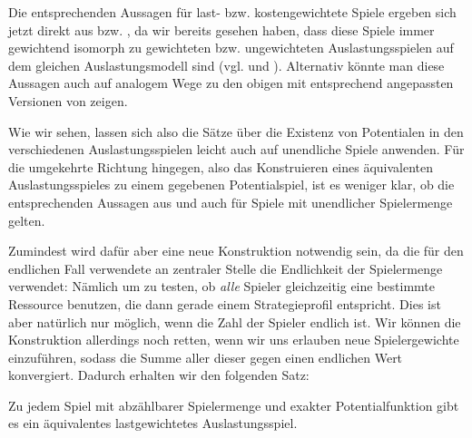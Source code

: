 \begin{bem}\label{bem:UnendlLastKostGewAusl}
	Die entsprechenden Aussagen für last- bzw. kostengewichtete Spiele ergeben sich jetzt direkt aus  bzw. , da wir bereits gesehen haben, dass diese Spiele immer gewichtend isomorph zu gewichteten bzw. ungewichteten Auslastungsspielen auf dem gleichen Auslastungsmodell sind (vgl.  und ). Alternativ könnte man diese Aussagen auch auf analogem Wege zu den obigen mit entsprechend angepassten Versionen von  zeigen.
\end{bem}

Wie wir sehen, lassen sich also die Sätze über die Existenz von Potentialen in den verschiedenen Auslastungsspielen leicht auch auf unendliche Spiele anwenden. Für die umgekehrte Richtung hingegen, also das Konstruieren eines äquivalenten Auslastungsspieles zu einem gegebenen Potentialspiel, ist es weniger klar, ob die entsprechenden Aussagen aus  und  auch für Spiele mit unendlicher Spielermenge gelten. 

Zumindest wird dafür aber eine neue Konstruktion notwendig sein, da die für den endlichen Fall verwendete an zentraler Stelle die Endlichkeit der Spielermenge verwendet: Nämlich um zu testen, ob \emph{alle} Spieler gleichzeitig eine bestimmte Ressource benutzen, die dann gerade einem Strategieprofil entspricht. Dies ist aber natürlich nur möglich, wenn die Zahl der Spieler endlich ist. Wir können die Konstruktion allerdings noch retten, wenn wir uns erlauben neue Spielergewichte einzuführen, sodass die Summe aller dieser gegen einen endlichen Wert konvergiert. Dadurch erhalten wir den folgenden Satz:

\begin{satz}\label{satz:ReprAbzbarerExPotspieleDurchLastgewAusl}
	Zu jedem Spiel mit abzählbarer Spielermenge und exakter Potentialfunktion gibt es ein äquivalentes lastgewichtetes Auslastungsspiel.
\end{satz}


